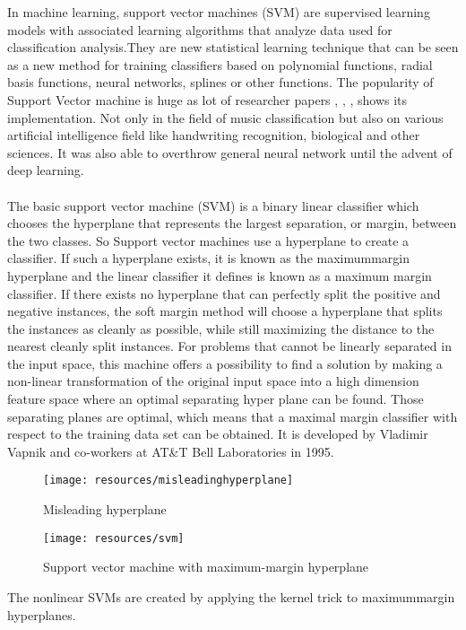 {In machine learning, support vector machines (SVM) are supervised learning models with 
associated learning algorithms that analyze data used for classification analysis.They are new statistical learning technique that can be seen as a new method for training
classifiers based on polynomial functions, radial basis functions, neural networks, splines or other functions. The popularity of Support Vector machine is huge as lot of researcher papers
\cite{Koerich2013}, \cite{Anglade2010}, \cite{Haggblade2011}, \cite{Kour2015} shows its implementation. Not only in the field of music classification but also on various artificial intelligence field like handwriting
recognition, biological and other sciences. It was also able to overthrow general neural network until the advent of deep learning.\\
\\
The basic support vector machine (SVM) is a binary linear classifier which chooses the hyperplane that represents the largest separation, or margin, between the two classes. So  Support vector machines use
a hyperplane to create a classifier. If such a hyperplane exists, it is known as the maximum­margin hyperplane and the linear classifier it defines is known as a maximum margin classifier. 
If there exists no hyperplane that can perfectly split the positive and negative instances, the soft 
margin method will choose a hyperplane that splits the instances as cleanly as possible, while still 
maximizing the distance to the nearest cleanly split instances. For problems that cannot be linearly separated in the input space, this machine offers a possibility to find a solution by making 
a non-linear transformation of the original input space into a high dimension feature space where an optimal separating hyper plane can be found. Those separating planes are optimal, which means
that a maximal margin classifier with respect to the training data set can be obtained. It is developed by Vladimir Vapnik and co-workers at AT\&T Bell Laboratories in 1995.\\
\begin{figure}[h]
        \texttt{[image: resources/misleadinghyperplane]}
        \caption{Misleading hyperplane}
\end{figure}
\begin{figure}[h]
        \texttt{[image: resources/svm]}
        \caption{Support vector machine with maximum-margin hyperplane}
\end{figure}
The nonlinear SVMs are created by applying the kernel trick to maximum­margin hyperplanes. 
}
